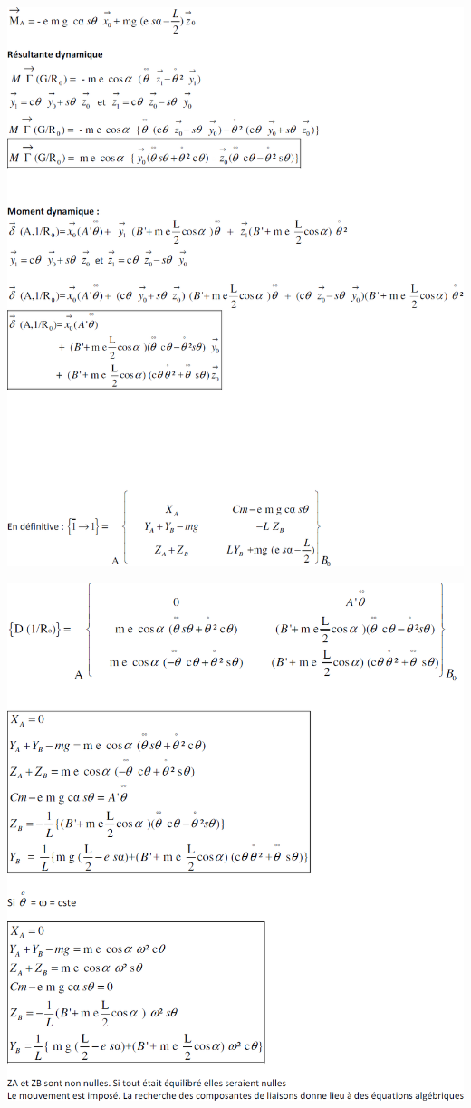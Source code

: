 \documentclass[10pt,fleqn]{article} %
\begin{document}
\begin{center}
\includegraphics[width=\linewidth]{images/cor_04}
\end{center}
\begin{center}
\includegraphics[width=\linewidth]{images/cor_05}
\end{center}


\end{document}
